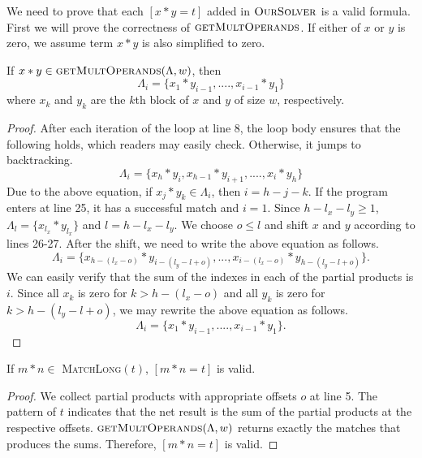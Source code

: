 We need to prove that each $[x*y = t]$ added in $\textsc{OurSolver}$
is a valid formula.
%
First we will prove the correctness of $\textsc{getMultOperands}$.
%
If either of $x$ or $y$ is zero, we assume term $x*y$ is also simplified to zero.
\begin{thm}
 If $ x*y \in \textsc{getMultOperands}(\Lambda,w)$, then
 $$
 \Lambda_i = \{ x_1*y_{i-1},....,x_{i-1}*y_1 \}
 $$
  where $x_k$ and $y_k$ are the $k$th block of $x$ and $y$ of size
$w$, respectively.
\end{thm}
\begin{proof}
  After each iteration of the loop at line 8,
  the loop body ensures that the following holds, which readers 
  may easily check.
  Otherwise, it jumps to backtracking.
  $$
  \Lambda_i = \{ x_h*y_{i}, x_{h-1}*y_{i+1},....,x_{i}*y_h \}
  $$
  Due to the above equation,
  if $x_j*y_k \in \Lambda_i$, then $ i = h-j-k$.
  If the program enters at line 25, it has a successful match and $i=1$.
  Since $h-l_x -l_y \geq 1$, $\Lambda_l = \{x_{l_x}*y_{l_x}\}$
  and $l = h - l_x - l_y$.
  We choose $o \leq l$ and shift $x$ and $y$ according to lines 26-27.
  After the shift, we need to write the above equation as follows.
  $$
  \Lambda_i = \{ x_{h-(l_x-o)}*y_{i-(l_y-l+o)},...,x_{i-(l_x-o)}*y_{h-(l_y-l+o)} \}.
  $$
  We can easily verify that the sum of the indexes in each of
  the partial products is $i$.
  Since all $x_k$ is zero for $k > h-(l_x-o)$ and all $y_k$ is zero
  for $k > h-(l_y-l+o)$,
  we may rewrite the above equation as follows.
  $$
  \Lambda_i = \{ x_1*y_{i-1},....,x_{i-1}*y_1 \}.
  $$
\end{proof}

\begin{thm}
  If $m*n\in$ \textsc{MatchLong}$(t)$, $[m*n = t]$ is valid.
\end{thm}
\begin{proof}
  We collect partial products with appropriate offsets $o$ at line 5.
  The pattern of $t$ indicates that the net result is the sum of the 
  partial products at the respective offsets. 
  $\textsc{getMultOperands}(\Lambda,w)$ returns exactly the
  matches that produces the sums.
  Therefore, $[m*n = t]$ is valid.
\end{proof}

